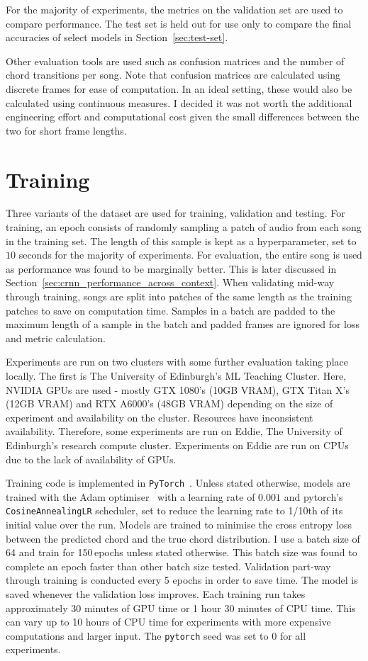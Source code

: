 For the majority of experiments, the metrics on the validation set are used to compare performance. The test set is held out for use only to compare the final accuracies of select models in Section~\ref{sec:test-set}.

Other evaluation tools are used such as confusion matrices and the number of chord transitions per song. Note that confusion matrices are calculated using discrete frames for ease of computation. In an ideal setting, these would also be calculated using continuous measures. I decided it was not worth the additional engineering effort and computational cost given the small differences between the two for short frame lengths.

\section{Training}\label{sec:training}

Three variants of the dataset are used for training, validation and testing. For training, an epoch consists of randomly sampling a patch of audio from each song in the training set. The length of this sample is kept as a hyperparameter, set to $10$ seconds for the majority of experiments. For evaluation, the entire song is used as performance was found to be marginally better. This is later discussed in Section~\ref{sec:crnn_performance_across_context}. When validating mid-way through training, songs are split into patches of the same length as the training patches to save on computation time. Samples in a batch are padded to the maximum length of a sample in the batch and padded frames are ignored for loss and metric calculation.

Experiments are run on two clusters with some further evaluation taking place locally. The first is The University of Edinburgh's ML Teaching Cluster. Here, NVIDIA GPUs are used - mostly GTX 1080's (10GB VRAM), GTX Titan X's (12GB VRAM) and RTX A6000's (48GB VRAM) depending on the size of experiment and availability on the cluster. Resources have inconsistent availability. Therefore, some experiments are run on Eddie, The University of Edinburgh's research compute cluster. Experiments on Eddie are run on CPUs due to the lack of availability of GPUs.

Training code is implemented in \texttt{PyTorch}~\citep{pytorch}. Unless stated otherwise, models are trained with the Adam optimiser~\citep{adam} with a learning rate of $0.001$ and pytorch's \texttt{CosineAnnealingLR} scheduler, set to reduce the learning rate to 1/10th of its initial value over the run. Models are trained to minimise the cross entropy loss between the predicted chord and the true chord distribution. I use a batch size of 64 and train for 150\,epochs unless stated otherwise. This batch size was found to complete an epoch faster than other batch size tested. Validation part-way through training is conducted every 5 epochs in order to save time. The model is saved whenever the validation loss improves. Each training run takes approximately 30 minutes of GPU time or 1 hour 30 minutes of CPU time. This can vary up to 10 hours of CPU time for experiments with more expensive computations and larger input. The \texttt{pytorch} seed was set to $0$ for all experiments.

